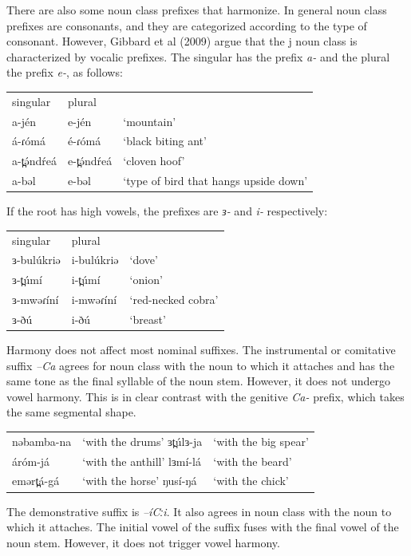 There are also some noun class prefixes that harmonize. In general noun class prefixes are consonants, and they are categorized according to the type of consonant. However, Gibbard et al (2009) argue that the j noun class is characterized by vocalic prefixes. The singular has the prefix \textit{a-} and the plural the prefix \textit{e-}, as follows:

\ea
\begin{tabular}[t]{lll}
	singular	&	plural\\
	a-jén 	&	e-jén 	&	‘mountain’\\
	á-ɾómá 	&	é-ɾómá 	&	‘black biting ant’\\
	a-t̪ə́ndŕeá&	e-t̪ə́ndŕeá&	‘cloven hoof’\\
	a-bəl	&	e-bəl	&	‘type of bird that hangs upside down’\\
\end{tabular}
\z

If the root has high vowels, the prefixes are \textit{ɜ-} and \textit{i-} respectively:	

\ea
\begin{tabular}[t]{lll}
	singular	&	plural\\
	ɜ-bulúkriə 	&	i-bulúkriə 	&	‘dove’\\
	ɜ-t̪úmí 		&	i-t̪úmí 		&	‘onion’\\
	ɜ-mwəɾíní	&	i-mwəɾíní	&	‘red-necked cobra’\\
	ɜ-ðú		&	i-ðú			&	‘breast’\\
\end{tabular}
\z

Harmony does not affect most nominal suffixes. The instrumental or comitative suffix \textit{–Ca} agrees for noun class with the noun to which it attaches and has the same tone as the final syllable of the noun stem. However, it does not undergo vowel harmony. This is in clear contrast with the genitive \textit{Ca-} prefix, which takes the same segmental shape.

\ea
\begin{tabular}[t]{lll}
	nəbamba-na	&	‘with the drums’	ɜt̪úlɜ-ja	&	‘with the big spear’\\
	áróm-já		&	‘with the anthill’	lɜmí-lá	&	‘with the beard’\\
	emərt̪á-gá	&	‘with the horse’	ŋusí-ŋá		&	‘with the chick’\\
\end{tabular}
\z

The demonstrative suffix is \textit{–íCːi}. It also agrees in noun class with the noun to which it attaches. The initial vowel of the suffix fuses with the final vowel of the noun stem. However, it does not trigger vowel harmony. 

